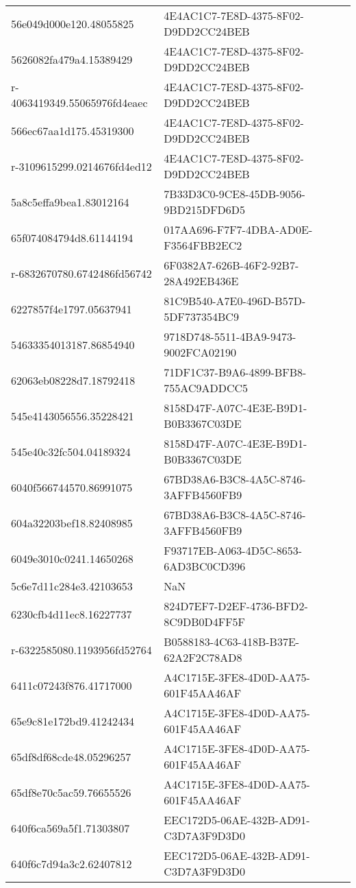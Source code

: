 \begin{tabular}{ll}
56e049d000e120.48055825 & 4E4AC1C7-7E8D-4375-8F02-D9DD2CC24BEB \\
5626082fa479a4.15389429 & 4E4AC1C7-7E8D-4375-8F02-D9DD2CC24BEB \\
r-4063419349.55065976fd4eaec & 4E4AC1C7-7E8D-4375-8F02-D9DD2CC24BEB \\
566ec67aa1d175.45319300 & 4E4AC1C7-7E8D-4375-8F02-D9DD2CC24BEB \\
r-3109615299.0214676fd4ed12 & 4E4AC1C7-7E8D-4375-8F02-D9DD2CC24BEB \\
5a8c5effa9bea1.83012164 & 7B33D3C0-9CE8-45DB-9056-9BD215DFD6D5 \\
65f074084794d8.61144194 & 017AA696-F7F7-4DBA-AD0E-F3564FBB2EC2 \\
r-6832670780.6742486fd56742 & 6F0382A7-626B-46F2-92B7-28A492EB436E \\
6227857f4e1797.05637941 & 81C9B540-A7E0-496D-B57D-5DF737354BC9 \\
54633354013187.86854940 & 9718D748-5511-4BA9-9473-9002FCA02190 \\
62063eb08228d7.18792418 & 71DF1C37-B9A6-4899-BFB8-755AC9ADDCC5 \\
545e4143056556.35228421 & 8158D47F-A07C-4E3E-B9D1-B0B3367C03DE \\
545e40c32fc504.04189324 & 8158D47F-A07C-4E3E-B9D1-B0B3367C03DE \\
6040f566744570.86991075 & 67BD38A6-B3C8-4A5C-8746-3AFFB4560FB9 \\
604a32203bef18.82408985 & 67BD38A6-B3C8-4A5C-8746-3AFFB4560FB9 \\
6049e3010c0241.14650268 & F93717EB-A063-4D5C-8653-6AD3BC0CD396 \\
5c6e7d11c284e3.42103653 & NaN \\
6230cfb4d11ec8.16227737 & 824D7EF7-D2EF-4736-BFD2-8C9DB0D4FF5F \\
r-6322585080.1193956fd52764 & B0588183-4C63-418B-B37E-62A2F2C78AD8 \\
6411c07243f876.41717000 & A4C1715E-3FE8-4D0D-AA75-601F45AA46AF \\
65e9c81e172bd9.41242434 & A4C1715E-3FE8-4D0D-AA75-601F45AA46AF \\
65df8df68cde48.05296257 & A4C1715E-3FE8-4D0D-AA75-601F45AA46AF \\
65df8e70c5ac59.76655526 & A4C1715E-3FE8-4D0D-AA75-601F45AA46AF \\
640f6ca569a5f1.71303807 & EEC172D5-06AE-432B-AD91-C3D7A3F9D3D0 \\
640f6c7d94a3c2.62407812 & EEC172D5-06AE-432B-AD91-C3D7A3F9D3D0 \\

\end{tabular}
